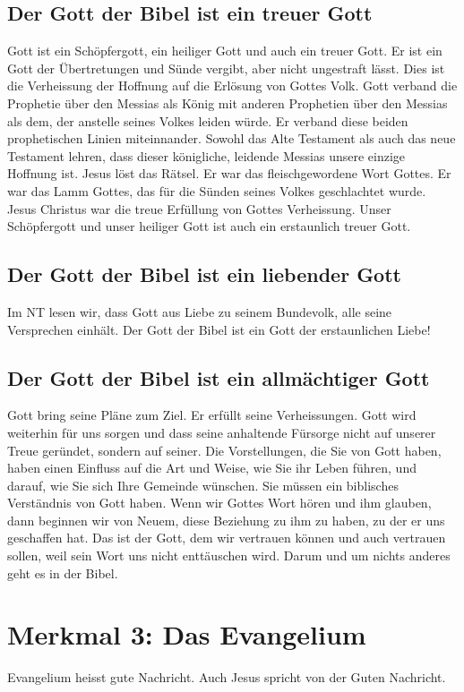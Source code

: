 \documentclass{../../inc/mybib}
\begin{document}
\subsection*{Der Gott der Bibel ist ein treuer Gott}
Gott ist ein Schöpfergott, ein heiliger Gott und auch ein treuer Gott. Er ist ein Gott der Übertretungen und Sünde vergibt, aber nicht ungestraft lässt. Dies ist die Verheissung der Hoffnung auf die Erlösung von Gottes Volk. Gott verband die Prophetie über den Messias als König mit anderen Prophetien über den Messias als dem, der anstelle seines Volkes leiden würde. Er verband diese beiden prophetischen Linien miteinnander. Sowohl das Alte Testament als auch das neue Testament lehren, dass dieser königliche, leidende Messias unsere einzige Hoffnung ist. Jesus löst das Rätsel. Er war das fleischgewordene Wort Gottes. Er war das Lamm Gottes, das für die Sünden seines Volkes geschlachtet wurde. Jesus Christus war die treue Erfüllung von Gottes Verheissung. Unser Schöpfergott und unser heiliger Gott ist auch ein erstaunlich treuer Gott.
\subsection*{Der Gott der Bibel ist ein liebender Gott}
Im NT lesen wir, dass Gott aus Liebe zu seinem Bundevolk, alle seine Versprechen einhält. Der Gott der Bibel ist ein Gott der erstaunlichen Liebe!
\subsection*{Der Gott der Bibel ist ein allmächtiger Gott}
Gott bring seine Pläne zum Ziel. Er erfüllt seine Verheissungen. Gott wird weiterhin für uns sorgen und dass seine anhaltende Fürsorge nicht auf unserer Treue geründet, sondern auf seiner. Die Vorstellungen, die Sie von Gott haben, haben einen Einfluss auf die Art und Weise, wie Sie ihr Leben führen, und darauf, wie Sie sich Ihre Gemeinde wünschen. Sie müssen ein biblisches Verständnis von Gott haben. Wenn wir Gottes Wort hören und ihm glauben, dann beginnen wir von Neuem, diese Beziehung zu ihm zu haben, zu der er uns geschaffen hat. Das ist der Gott, dem wir vertrauen können und auch vertrauen sollen, weil sein Wort uns nicht enttäuschen wird. Darum und um nichts anderes geht es in der Bibel.
\section*{Merkmal 3: Das Evangelium}
Evangelium heisst gute Nachricht. Auch Jesus spricht von der Guten Nachricht.
\end{document}
